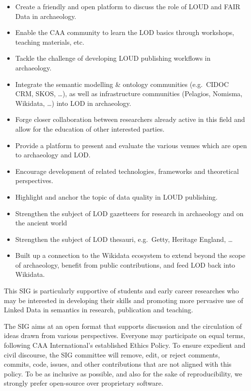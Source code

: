 \documentclass[a4paper]{article}
\begin{document}
\begin{itemize}
\item
  Create a friendly and open platform to discuss the role of LOUD and FAIR Data in archaeology.
\item
  Enable the CAA community to learn the LOD basics through workshops, teaching materials, etc.
\item
  Tackle the challenge of developing LOUD publishing workflows in archaeology.
\item
  Integrate the semantic modelling \& ontology communities (e.g.~CIDOC CRM, SKOS, \ldots{}), as well as infrastructure communities (Pelagios, Nomisma, Wikidata, \ldots{}) into LOD in archaeology.
\item
  Forge closer collaboration between researchers already active in this field and allow for the education of other interested parties.
\item
  Provide a platform to present and evaluate the various venues which are open to archaeology and LOD.
\item
  Encourage development of related technologies, frameworks and theoretical perspectives.
\item
  Highlight and anchor the topic of data quality in LOUD publishing.
\item
  Strengthen the subject of LOD gazetteers for research in archaeology and on the ancient world
\item
  Strengthen the subject of LOD thesauri, e.g.~Getty, Heritage England, \ldots{}
\item
  Built up a connection to the Wikidata ecosystem to extend beyond the scope of archaeology, benefit from public contributions, and feed LOD back into Wikidata.
\end{itemize}

This SIG is particularly supportive of students and early career researches who may be interested in developing their skills and promoting more pervasive use of Linked Data in semantics in research, publication and teaching.

The SIG aims at an open format that supports discussion and the circulation of ideas drawn from various perspectives. Everyone may participate on equal terms, following CAA International's established Ethics Policy. To ensure expedient and civil discourse, the SIG committee will remove, edit, or reject comments, commits, code, issues, and other contributions that are not aligned with this policy. To be as inclusive as possible, and also for the sake of reproducibility, we strongly prefer open-source over proprietary software.
\end{document}
